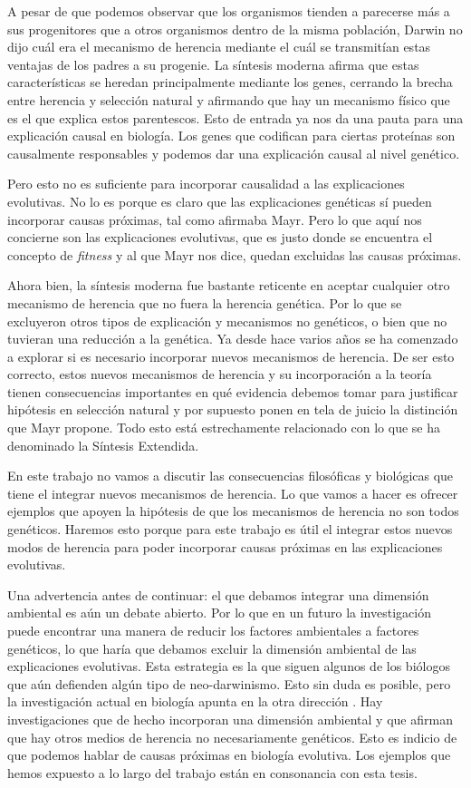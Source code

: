A pesar de que podemos observar que los organismos tienden a parecerse más a sus progenitores que a otros organismos dentro de la misma población, Darwin no dijo cuál era el mecanismo de herencia mediante el cuál se transmitían estas ventajas de los padres a su progenie. La síntesis moderna afirma que estas características se heredan principalmente mediante los genes, cerrando la brecha entre herencia y selección natural y afirmando que hay un mecanismo físico que es el que explica estos parentescos. Esto de entrada ya nos da una pauta para una explicación causal en biología. Los genes que codifican para ciertas proteínas son causalmente responsables y podemos dar una explicación causal al nivel genético.

Pero esto no es suficiente para incorporar causalidad a las explicaciones evolutivas. No lo es porque es claro que las explicaciones genéticas sí pueden incorporar causas próximas, tal como afirmaba Mayr. Pero lo que aquí nos concierne son las explicaciones evolutivas, que es justo donde se encuentra el concepto de \emph{fitness} y al que Mayr nos dice, quedan excluidas las causas próximas.

Ahora bien, la síntesis moderna fue bastante reticente en aceptar cualquier otro mecanismo de herencia que no fuera la herencia genética. Por lo que se excluyeron otros tipos de explicación y mecanismos no genéticos, o bien que no tuvieran una reducción a la genética. Ya desde hace varios años se ha comenzado a explorar si es necesario incorporar nuevos mecanismos de herencia. De ser esto correcto, estos nuevos mecanismos de herencia y su incorporación a la teoría tienen consecuencias importantes en qué evidencia debemos tomar para justificar hipótesis en selección natural y por supuesto ponen en tela de juicio la distinción que Mayr propone. Todo esto está estrechamente relacionado con lo que se ha denominado la Síntesis Extendida.

En este trabajo no vamos a discutir las consecuencias filosóficas y biológicas que tiene el integrar nuevos mecanismos de herencia. Lo que vamos a hacer es ofrecer ejemplos que apoyen la hipótesis de que los mecanismos de herencia no son todos genéticos. Haremos esto porque para este trabajo es útil el integrar estos nuevos modos de herencia para poder incorporar causas próximas en las explicaciones evolutivas.

Una advertencia antes de continuar: el que debamos integrar una dimensión ambiental es aún un debate abierto. Por lo que en un futuro la investigación puede encontrar una manera de reducir los factores ambientales a factores genéticos, lo que haría que debamos excluir la dimensión ambiental de las explicaciones evolutivas. Esta estrategia es la que siguen algunos de los biólogos que aún defienden algún tipo de neo-darwinismo. Esto sin duda es posible, pero la investigación actual en biología apunta en la otra dirección  \cite{Bateson2014}. Hay investigaciones que de hecho incorporan una dimensión ambiental y que afirman que hay otros medios de herencia no necesariamente genéticos. Esto es indicio de que podemos hablar de causas próximas en biología evolutiva. Los ejemplos que hemos expuesto a lo largo del trabajo están en consonancia con esta tesis.

